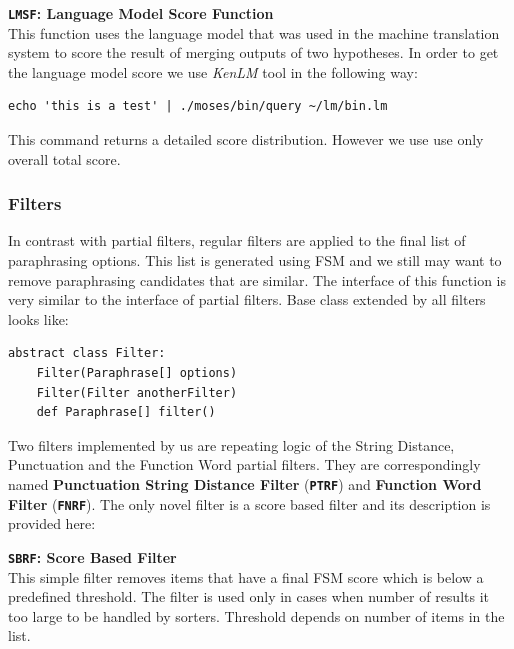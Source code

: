 \begin{flushleft}
\textbf{\texttt{LMSF}: \textbf{Language Model Score Function}} \\
This function uses the language model that was used in the machine translation system to score the result of merging outputs of two hypotheses. In order to get the language model score we use \emph{KenLM} tool in the following way:

\begin{verbatim}
echo 'this is a test' | ./moses/bin/query ~/lm/bin.lm
\end{verbatim}

This command returns a detailed score distribution. However we use use only overall total score.
\bigskip

\end{flushleft}


\subsubsection{Filters}

In contrast with partial filters, regular filters are applied to the final list of paraphrasing options. This list is generated using FSM and we still may want to remove paraphrasing candidates that are similar. The interface of this function is very similar to the interface of partial filters. Base class extended by all filters looks like:

\begin{verbatim}
abstract class Filter:
    Filter(Paraphrase[] options)
    Filter(Filter anotherFilter)
    def Paraphrase[] filter()
\end{verbatim}

Two filters implemented by us are repeating logic of the String Distance, Punctuation and the Function Word partial filters. They are correspondingly named \textbf{Punctuation String Distance Filter} (\textbf{\texttt{PTRF}}) and \textbf{Function Word Filter} (\texttt{\textbf{FNRF}}). The only novel filter is a score based filter and its description is provided here:


\begin{flushleft}

\textbf{\texttt{SBRF}: \textbf{Score Based Filter}} \\
This simple filter removes items that have a final FSM score which is below a predefined threshold. 
The filter is used only in cases when number of results it too large to be handled by sorters. Threshold depends on number of items in the list.
\bigskip

\end{flushleft}

